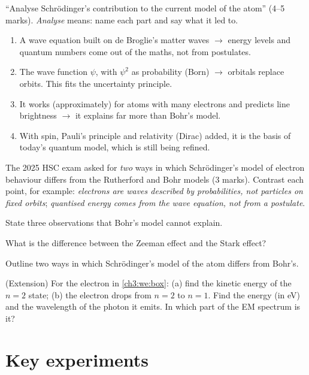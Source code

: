 \begin{examtip}
``Analyse Schrödinger's contribution to the current model of the atom'' (4--5 marks).
\emph{Analyse} means: name each part and say what it led to.
\begin{enumerate}
  \item A wave equation built on de Broglie's matter waves $\to$ energy levels and quantum
        numbers come out of the maths, not from postulates.
  \item The wave function $\psi$, with $\psi^2$ as probability (Born) $\to$ orbitals replace
        orbits. This fits the uncertainty principle.
  \item It works (approximately) for atoms with many electrons and predicts line brightness
        $\to$ it explains far more than Bohr's model.
  \item With spin, Pauli's principle and relativity (Dirac) added, it is the basis of today's
        quantum model, which is still being refined.
\end{enumerate}
The 2025 HSC exam asked for \emph{two} ways in which Schrödinger's model of electron
behaviour differs from the Rutherford and Bohr models (3 marks). Contrast each point, for
example: \emph{electrons are waves described by probabilities, not particles on fixed orbits};
\emph{quantised energy comes from the wave equation, not from a postulate}.
\end{examtip}

\begin{quickcheck}
  \item State three observations that Bohr's model cannot explain.
  \item What is the difference between the Zeeman effect and the Stark effect?
  \item Outline two ways in which Schrödinger's model of the atom differs from Bohr's.
  \item (Extension) For the electron in \cref{ch3:we:box}: (a) find the kinetic energy of the
        $n = 2$ state; (b) the electron drops from $n = 2$ to $n = 1$. Find the energy (in eV)
        and the wavelength of the photon it emits. In which part of the EM spectrum is it?
\end{quickcheck}

\section{Key experiments}\label{ch3:sec:experiments}

